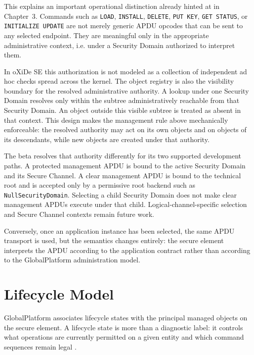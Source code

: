This explains an important operational distinction already hinted at in
Chapter~3. Commands such as \texttt{LOAD}, \texttt{INSTALL},
\texttt{DELETE}, \texttt{PUT KEY}, \texttt{GET STATUS}, or
\texttt{INITIALIZE UPDATE} are not merely generic APDU opcodes that can
be sent to any selected endpoint. They are meaningful only in the
appropriate administrative context, i.e. under a Security Domain
authorized to interpret them.

In oXiDe SE this authorization is not modeled as a collection of
independent ad hoc checks spread across the kernel. The object registry is
also the visibility boundary for the resolved administrative authority. A
lookup under one Security Domain resolves only within the subtree
administratively reachable from that Security Domain. An object outside this
visible subtree is treated as absent in that context. This design makes the
management rule above mechanically enforceable: the resolved authority may
act on its own objects and on objects of its descendants, while new objects
are created under that authority.

The beta resolves that authority differently for its two supported development
paths. A protected management APDU is bound to the active Security Domain and
its Secure Channel. A clear management APDU is bound to the technical root and
is accepted only by a permissive root backend such as
\texttt{NullSecurityDomain}. Selecting a child Security Domain does not make
clear management APDUs execute under that child. Logical-channel-specific
selection and Secure Channel contexts remain future work.

Conversely, once an application instance has been selected, the same APDU
transport is used, but the semantics changes entirely: the secure element
interprets the APDU according to the application contract rather than
according to the GlobalPlatform administration model.

\section{Lifecycle Model}
\label{sec:gp-lifecycle-model}


GlobalPlatform associates lifecycle states with the principal managed
objects on the secure element. A lifecycle state is more than a diagnostic label:
it controls what operations are currently permitted on a given entity and
which command sequences remain legal .

